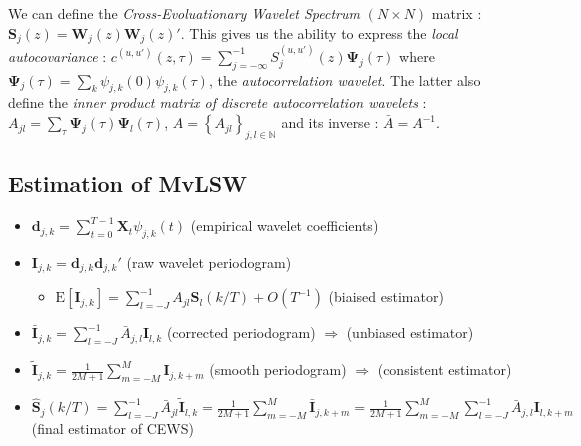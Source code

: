 \documentclass{article}
\numberwithin{equation}{section}
\let \oldsum \sum
\renewcommand{\sum}{\displaystyle \oldsum}
\newcommand{\CEWS}[2]{\bm{S}_{#1}\left(#2/T\right)}
\newcommand{\wavelet}[3]{\psi_{#1,#2}(#3)}
\newcommand{\ACwavelet}[2]{\bm{\Psi}_{#1}(#2)}
\newcommand{\coeffs}[2]{\bm{d}_{#1,#2}}
\newcommand{\rawPeriodo}[2]{\bm{I}_{#1,#2}}
\newcommand{\correctedPeriodo}[2]{\bar{\bm{I}}_{#1,#2}}
\newcommand{\smoothPeriodo}[2]{\widetilde{\bm{I}}_{#1,#2}}
\newcommand{\estimCEWS}[2]{\widehat{\bm{S}}_{#1}\left(#2/T\right)}
\newcommand{\E}[1]{\mathrm{E}\left[#1\right]}
\begin{document}
We can define the \emph{Cross-Evoluationary Wavelet Spectrum} $(N \times N)$ matrix : $\bm{S}_{j}(z) = \bm{W}_{j}(z)\bm{W}_{j}(z)'$.
This gives us the ability to express the \emph{local autocovariance} : $c^{(u,u')}(z,\tau) = \sum_{j=-\infty}^{-1} S_{j}^{(u,u')}(z) \ACwavelet{j}{\tau}$ where $\ACwavelet{j}{\tau} = \sum_{k} \wavelet{j}{k}{0}\wavelet{j}{k}{\tau}$, the \emph{autocorrelation wavelet}. The latter also define the \emph{inner product matrix of discrete autocorrelation wavelets} : $A_{jl} = \sum_{\tau}\ACwavelet{j}{\tau}\ACwavelet{l}{\tau}$, $A = \left\{ A_{jl}\right\}_{j,l \in \mathbb{N}}$ and its inverse : $\bar{A} = A^{-1}$.

\subsection{Estimation of MvLSW}
\begin{itemize}
	\item $\coeffs{j}{k} = \sum_{t=0}^{T-1}\bm{X}_t \wavelet{j}{k}{t}$  \hspace{2cm} (empirical wavelet coefficients)
	\item $\rawPeriodo{j}{k} = \coeffs{j}{k}\coeffs{j}{k}'$  \hspace{2cm} (raw wavelet periodogram)
		\begin{itemize}
			\item $\E{\rawPeriodo{j}{k}} = \sum_{l=-J}^{-1} A_{jl}\CEWS{l}{k} + O(T^{-1})$ \hspace{2cm} (biaised estimator)
		\end{itemize}
	\item $\correctedPeriodo{j}{k} = \sum_{l=-J}^{-1} \bar{A}_{j,l}\rawPeriodo{l}{k}$ \hspace{2cm} (corrected periodogram) $\Longrightarrow$ (unbiased estimator)
	\item $\smoothPeriodo{j}{k} = \frac{\displaystyle 1}{\displaystyle 2M+1} \sum_{m=-M}^{M}\rawPeriodo{j}{k+m} $ \hspace{2cm} (smooth periodogram) $\Longrightarrow$ (consistent estimator)
	\item $\estimCEWS{j}{k} = \sum_{l=-J}^{-1}\bar{A}_{jl}\smoothPeriodo{l}{k} = \frac{\displaystyle 1}{\displaystyle 2M+1} \sum_{m=-M}^{M}\correctedPeriodo{j}{k+m} = \frac{\displaystyle 1}{\displaystyle 2M+1} \sum_{m=-M}^{M}\sum_{l=-J}^{-1} \bar{A}_{j,l}\rawPeriodo{l}{k+m}$ \hspace{1cm} (final estimator of CEWS)
\end{itemize}
\end{document}
